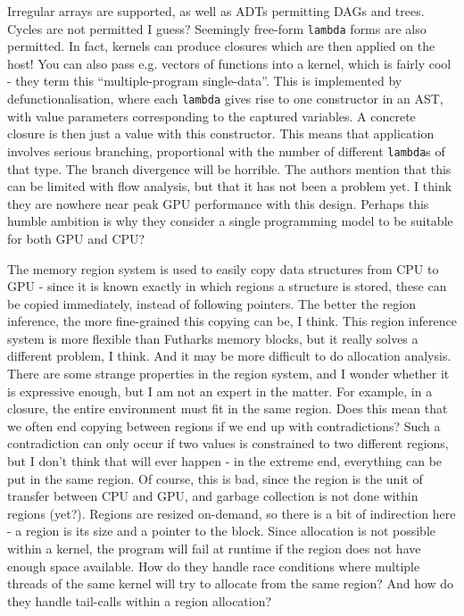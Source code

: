 \documentclass[a4paper, oneside, final]{memoir}
\begin{document}
Irregular arrays are supported, as well as ADTs permitting DAGs and
trees.  Cycles are not permitted I guess?  Seemingly free-form
\texttt{lambda} forms are also permitted.  In fact, kernels can
produce closures which are then applied on the host!  You can also
pass e.g. vectors of functions into a kernel, which is fairly cool -
they term this ``multiple-program single-data''.  This is implemented
by defunctionalisation, where each \texttt{lambda} gives rise to one
constructor in an AST, with value parameters corresponding to the
captured variables.  A concrete closure is then just a value with this
constructor.  This means that application involves serious branching,
proportional with the number of different \texttt{lambda}s of that
type.  The branch divergence will be horrible.  The authors mention
that this can be limited with flow analysis, but that it has not been
a problem yet.  I think they are nowhere near peak GPU performance
with this design.  Perhaps this humble ambition is why they consider a
single programming model to be suitable for both GPU and CPU?

The memory region system is used to easily copy data structures from
CPU to GPU - since it is known exactly in which regions a structure is
stored, these can be copied immediately, instead of following
pointers.  The better the region inference, the more fine-grained this
copying can be, I think.  This region inference system is more
flexible than Futharks memory blocks, but it really solves a different
problem, I think.  And it may be more difficult to do allocation
analysis.  There are some strange properties in the region system, and
I wonder whether it is expressive enough, but I am not an expert in
the matter.  For example, in a closure, the entire environment must
fit in the same region.  Does this mean that we often end copying
between regions if we end up with contradictions?  Such a
contradiction can only occur if two values is constrained to two
different regions, but I don't think that will ever happen - in the
extreme end, everything can be put in the same region.  Of course,
this is bad, since the region is the unit of transfer between CPU and
GPU, and garbage collection is not done within regions (yet?).
Regions are resized on-demand, so there is a bit of indirection here -
a region is its size and a pointer to the block.  Since allocation is
not possible within a kernel, the program will fail at runtime if the
region does not have enough space available.  How do they handle race
conditions where multiple threads of the same kernel will try to
allocate from the same region?  And how do they handle tail-calls
within a region allocation?
\end{document}

